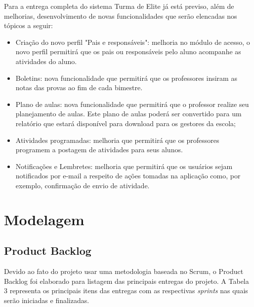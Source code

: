 \documentclass[
    12pt,               %
    openright,          %
    oneside,
    a4paper,            %
    paginasA3,  %
    MODELO,             %
    TODO,               %
    english,            %
    brazil              %
    ]{ifsp-spo-inf-ctds} %
\begin{document}
Para a entrega completa do sistema Turma de Elite já está previso, além de melhorias, desenvolvimento de novas funcionalidades que serão elencadas nos tópicos a seguir:
\begin{itemize}
\item  Criação do novo perfil "Pais e responsáveis": melhoria no módulo de acesso, o novo perfil permitirá que os pais ou responsáveis pelo aluno acompanhe as atividades do aluno.
\item  Boletins: nova funcionalidade que permitirá que os professores insiram as notas das provas ao fim de cada bimestre.
\item  Plano de aulas: nova funcionalidade que permitirá que o professor realize seu planejamento de aulas. Este plano de aulas poderá ser convertido para um relatório que estará disponível para download para os gestores da escola;
\item  Atividades programadas: melhoria que permitirá que os professores programem a postagem de atividades para seus alunos.
\item  Notificações e Lembretes: melhoria que permitirá que os usuários sejam notificados por e-mail a respeito de ações tomadas na aplicação como, por exemplo, confirmação de envio de atividade.
\end{itemize}

\section{Modelagem}
\subsection{Product Backlog}
Devido ao fato do projeto usar uma metodologia baseada no Scrum, o Product Backlog foi elaborado para listagem das principais entregas do projeto. A Tabela 3 representa os principais itens das entregas com as respectivas \textit{sprints} nas quais serão iniciadas e finalizadas.
\end{document}
